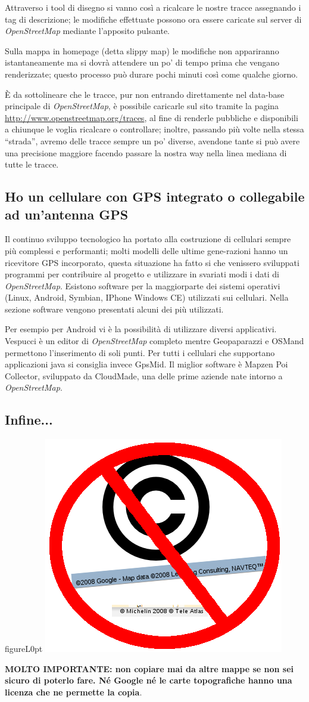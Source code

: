 \documentclass[a4paper,twoside,12pt,]{article}
\newcommand{\osm}{\emph{OpenStreetMap}\xspace}
\newcommand{\gps}{GPS\xspace}
\begin{document}
Attraverso i tool di disegno si vanno così a ricalcare le nostre tracce assegnando i tag di descrizione; le modifiche effettuate possono ora essere caricate sul server di \osm mediante l'apposito pulsante.

Sulla mappa in homepage (detta slippy map) le modifiche non appariranno istantaneamente ma si dovrà attendere un po' di tempo prima che vengano renderizzate; questo processo può durare pochi minuti così come qualche giorno.

È da sottolineare che le tracce, pur non entrando direttamente nel data-base principale di \osm, è possibile caricarle sul sito tramite la pagina \url{http://www.openstreetmap.org/traces}, al fine di renderle pubbliche e disponibili a chiunque le voglia ricalcare o controllare; inoltre, passando più volte nella stessa ``strada'', avremo delle tracce sempre un po' diverse, avendone tante si può avere una precisione maggiore facendo passare la nostra way nella linea mediana di tutte le tracce.
\subsection{Ho un cellulare con \gps integrato o collegabile ad un'antenna \gps}
Il continuo sviluppo tecnologico ha portato alla costruzione di cellulari sempre più complessi e performanti; molti modelli delle ultime gene-razioni hanno un ricevitore \gps incorporato, questa situazione ha fatto si che venissero sviluppati programmi per contribuire al progetto e utilizzare in svariati modi i dati di \osm. Esistono software per la maggiorparte dei sistemi operativi (Linux, Android, Symbian, IPhone Windows CE) utilizzati sui cellulari. Nella sezione software vengono presentati alcuni dei più utilizzati.

Per esempio per Android vi è la possibilità di utilizzare diversi applicativi. Vespucci è un editor di \osm completo mentre Geopaparazzi e OSMand permettono l'inserimento di soli punti. \newline
Per tutti i cellulari che supportano applicazioni java si consiglia invece GpsMid.\newline
Il miglior software è Mapzen Poi Collector, sviluppato da CloudMade, una delle prime aziende nate intorno a \osm.


\subsection{Infine...}
\begin{wrapfloat}{figure}{L}{0pt}
 \includegraphics[width=0.2\columnwidth]{noc.png}
\end{wrapfloat}
\textbf{MOLTO IMPORTANTE: non copiare mai da altre mappe se non sei sicuro di poterlo fare. Né Google né le carte topografiche hanno una licenza che ne permette la copia}.
\end{document}
